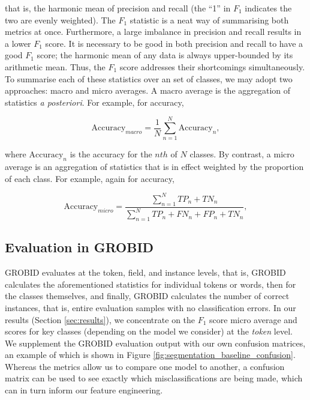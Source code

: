 that is, the harmonic mean of precision and recall (the ``1'' in $F_1$ indicates the two are evenly weighted). The $F_1$ statistic is a neat way of summarising both metrics at once. Furthermore, a large imbalance in precision and recall results in a lower $F_1$ score. It is necessary to be good in both precision and recall to have a good $F_1$ score; the harmonic mean of any data is always upper-bounded by its arithmetic mean. Thus, the $F_1$ score addresses their shortcomings simultaneously. To summarise each of these statistics over an set of classes, we may adopt two approaches: macro and micro averages. A macro average is the aggregation of statistics \emph{a posteriori}. For example, for accuracy,

\begin{equation}
\text{Accuracy}_{macro} = \frac{1}{N}\sum_{n=1}^{N}\text{Accuracy}_n,
\label{eq:macroaccuracy}
\end{equation}

where $\text{Accuracy}_n$ is the accuracy for the $nth$ of $N$ classes. By contrast, a micro average is an aggregation of statistics that is in effect weighted by the proportion of each class. For example, again for accuracy,

\begin{equation}
\text{Accuracy}_{micro} = \frac{\sum_{n=1}^N TP_n + TN_n}{\sum_{n=1}^N TP_n + FN_n + FP_n + TN_n},
\label{eq:microaccuracy}
\end{equation}

\subsection{Evaluation in GROBID}

GROBID evaluates at the token, field, and instance levels, that is, GROBID calculates the aforementioned statistics for individual tokens or words, then for the classes themselves, and finally, GROBID calculates the number of correct instances, that is, entire evaluation samples with no classification errors. In our results (Section \ref{sec:results}), we concentrate on the $F_1$ score micro average and scores for key classes (depending on the model we consider) at the \emph{token} level. We supplement the GROBID evaluation output with our own confusion matrices, an example of which is shown in Figure \ref{fig:segmentation_baseline_confusion}. Whereas the metrics allow us to compare one model to another, a confusion matrix can be used to see exactly which misclassifications are being made, which can in turn inform our feature engineering.

